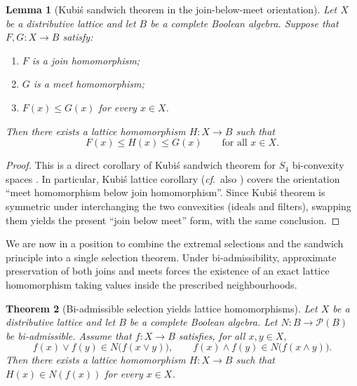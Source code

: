 \documentclass[11pt]{amsart}
\newtheorem{theorem}{Theorem}[section]
\newtheorem{lemma}[theorem]{Lemma}
\theoremstyle{definition}
\newcommand{\join}{\vee}
\newcommand{\meet}{\wedge}
\newcommand{\Pow}{\mathcal{P}}
\begin{document}
\begin{lemma}[Kubi\'s sandwich theorem in the join-below-meet orientation]
\label{lem:kubis-join-below-meet}
Let $X$ be a distributive lattice and let $B$ be a complete Boolean algebra.
Suppose that $F,G\colon X\to B$ satisfy:
\begin{enumerate}[label=(\roman*)]
\item $F$ is a join homomorphism;
\item $G$ is a meet homomorphism;
\item $F(x)\le G(x)$ for every $x\in X$.
\end{enumerate}
Then there exists a lattice homomorphism $H\colon X\to B$ such that
\[
F(x)\le H(x)\le G(x)\qquad\text{for all }x\in X.
\]
\end{lemma}

\begin{proof}
This is a direct corollary of Kubi\'s sandwich theorem for $S_4$ bi-convexity spaces
\cite[Theorem~3.3]{Kubis}.
In particular, Kubi\'s lattice corollary \cite[Theorem~3.7]{Kubis} (\emph{cf}.\ also \cite[Theorem~4]{BKP})
covers the orientation ``meet homomorphism below join homomorphism''.
Since Kubi\'s theorem is symmetric under interchanging the two convexities (ideals and filters),
swapping them yields the present ``join below meet'' form, with the same conclusion.
\end{proof}
We are now in a position to combine the extremal selections and the sandwich principle into
a single selection theorem.
Under bi-admissibility, approximate preservation of both joins and meets forces the existence
of an exact lattice homomorphism taking values inside the prescribed neighbourhoods.

\begin{theorem}[Bi-admissible selection yields lattice homomorphisms]\label{thm:bi-admissible}
Let $X$ be a distributive lattice and let $B$ be a complete Boolean algebra.
Let $N\colon B\to\Pow(B)$ be bi-admissible.
Assume that $f\colon X\to B$ satisfies, for all $x,y\in X$,
\[
f(x)\join f(y)\in N\bigl(f(x\join y)\bigr),\qquad
f(x)\meet f(y)\in N\bigl(f(x\meet y)\bigr).
\]
Then there exists a lattice homomorphism $H\colon X\to B$ such that $H(x)\in N(f(x))$ for every $x\in X$.
\end{theorem}
\end{document}
